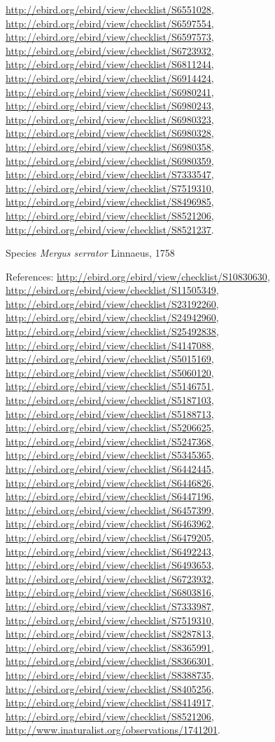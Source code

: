 \documentclass[9pt, article]{memoir}
\begin{document}
\begin{multicols}{2}
\url{http://ebird.org/ebird/view/checklist/S6551028}, 
\url{http://ebird.org/ebird/view/checklist/S6597554}, 
\url{http://ebird.org/ebird/view/checklist/S6597573}, 
\url{http://ebird.org/ebird/view/checklist/S6723932}, 
\url{http://ebird.org/ebird/view/checklist/S6811244}, 
\url{http://ebird.org/ebird/view/checklist/S6914424}, 
\url{http://ebird.org/ebird/view/checklist/S6980241}, 
\url{http://ebird.org/ebird/view/checklist/S6980243}, 
\url{http://ebird.org/ebird/view/checklist/S6980323}, 
\url{http://ebird.org/ebird/view/checklist/S6980328}, 
\url{http://ebird.org/ebird/view/checklist/S6980358}, 
\url{http://ebird.org/ebird/view/checklist/S6980359}, 
\url{http://ebird.org/ebird/view/checklist/S7333547}, 
\url{http://ebird.org/ebird/view/checklist/S7519310}, 
\url{http://ebird.org/ebird/view/checklist/S8496985}, 
\url{http://ebird.org/ebird/view/checklist/S8521206}, 
\url{http://ebird.org/ebird/view/checklist/S8521237}.

\vspace{6pt}\noindent\hspace{36pt}Species \textit{Mergus serrator} Linnaeus, 1758


\vspace{6pt}References: 
\url{http://ebird.org/ebird/view/checklist/S10830630}, 
\url{http://ebird.org/ebird/view/checklist/S11505349}, 
\url{http://ebird.org/ebird/view/checklist/S23192260}, 
\url{http://ebird.org/ebird/view/checklist/S24942960}, 
\url{http://ebird.org/ebird/view/checklist/S25492838}, 
\url{http://ebird.org/ebird/view/checklist/S4147088}, 
\url{http://ebird.org/ebird/view/checklist/S5015169}, 
\url{http://ebird.org/ebird/view/checklist/S5060120}, 
\url{http://ebird.org/ebird/view/checklist/S5146751}, 
\url{http://ebird.org/ebird/view/checklist/S5187103}, 
\url{http://ebird.org/ebird/view/checklist/S5188713}, 
\url{http://ebird.org/ebird/view/checklist/S5206625}, 
\url{http://ebird.org/ebird/view/checklist/S5247368}, 
\url{http://ebird.org/ebird/view/checklist/S5345365}, 
\url{http://ebird.org/ebird/view/checklist/S6442445}, 
\url{http://ebird.org/ebird/view/checklist/S6446826}, 
\url{http://ebird.org/ebird/view/checklist/S6447196}, 
\url{http://ebird.org/ebird/view/checklist/S6457399}, 
\url{http://ebird.org/ebird/view/checklist/S6463962}, 
\url{http://ebird.org/ebird/view/checklist/S6479205}, 
\url{http://ebird.org/ebird/view/checklist/S6492243}, 
\url{http://ebird.org/ebird/view/checklist/S6493653}, 
\url{http://ebird.org/ebird/view/checklist/S6723932}, 
\url{http://ebird.org/ebird/view/checklist/S6803816}, 
\url{http://ebird.org/ebird/view/checklist/S7333987}, 
\url{http://ebird.org/ebird/view/checklist/S7519310}, 
\url{http://ebird.org/ebird/view/checklist/S8287813}, 
\url{http://ebird.org/ebird/view/checklist/S8365991}, 
\url{http://ebird.org/ebird/view/checklist/S8366301}, 
\url{http://ebird.org/ebird/view/checklist/S8388735}, 
\url{http://ebird.org/ebird/view/checklist/S8405256}, 
\url{http://ebird.org/ebird/view/checklist/S8414917}, 
\url{http://ebird.org/ebird/view/checklist/S8521206}, 
\url{http://www.inaturalist.org/observations/1741201}.


\end{multicols}
\end{document}
